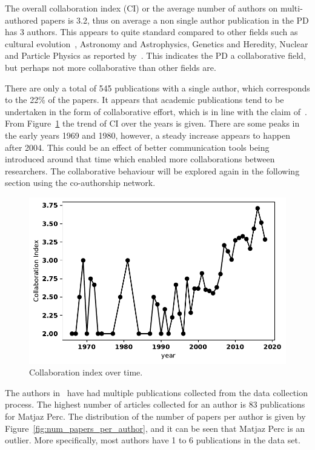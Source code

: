 \documentclass{article}
\theoremstyle{definition}
\begin{document}
The overall collaboration index (CI) or the average number of authors on
multi-authored papers is 3.2, thus on average a non single author publication in
the PD has 3 authors. This appears to quite standard compared to other fields
such as cultural evolution~\cite{youngblood2018}, Astronomy and Astrophysics,
Genetics and Heredity, Nuclear and Particle Physics as reported
by~\cite{nature_author_blog}. This indicates the PD a collaborative field, but
perhaps not more collaborative than other fields are.

There are only a total of 545 publications with a single author, which
corresponds to the 22\% of the papers. It appears that academic publications
tend to be undertaken in the form of collaborative effort, which is in line
with the claim of~\cite{Kyvik2017}. From
Figure~\ref{fig:ci_over_time} the trend of CI over the years is given. There are
some peaks in the early years 1969 and 1980, however, a steady increase appears
to happen after 2004. This could be an effect of better communication tools
being introduced around that time which enabled more collaborations between
researchers. The collaborative behaviour will be explored again in the
following section using the co-authorship network.

\begin{figure}[!hbtp]
    \centering
    \includegraphics[width=.55\textwidth]{./assets/images/collaborative_index.pdf}
    \caption{Collaboration index over time.}\label{fig:ci_over_time}
\end{figure}

The authors in~\cite{pd_data_2018} have had multiple publications collected from
the data collection process. The highest number of articles collected for an
author is 83 publications for Matjaz Perc. The distribution of the number of
papers per author is given by Figure~\ref{fig:num_papers_per_author}, and it can
be seen that Matjaz Perc is an outlier. More specifically, most authors have
1 to 6 publications in the data set.
\end{document}
